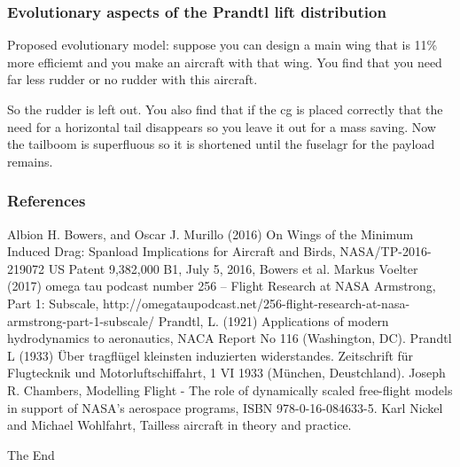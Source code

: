 \documentclass{beamer}
\begin{document}
\begin{frame}
\frametitle{Evolutionary aspects of the Prandtl lift distribution}

Proposed evolutionary model: suppose you can design a main wing that is 11\% more efficiemt and you make an aircraft with that wing. You find that you need far less rudder or no rudder with this aircraft.

So the rudder is left out. You also find that if the cg is placed correctly that the need for a horizontal tail disappears so you leave it out for a mass saving. Now the tailboom is superfluous so it is shortened until the fuselagr for the payload remains.

\end{frame}



\begin{frame}
\frametitle{References}
\footnotesize{
\begin{thebibliography}{99} %

 Albion H. Bowers, and Oscar J. Murillo (2016) On Wings of the Minimum Induced Drag:  Spanload Implications for Aircraft and Birds, NASA/TP-2016-219072
 US Patent 9,382,000 B1, July 5, 2016, Bowers et al.
 Markus Voelter (2017) omega tau podcast number 256 – Flight Research at NASA Armstrong, Part 1: Subscale, http://omegataupodcast.net/256-flight-research-at-nasa-armstrong-part-1-subscale/
 Prandtl, L.  (1921)  Applications  of  modern hydrodynamics  to  aeronautics,  NACA  Report  No  116 (Washington, DC).
 Prandtl L (1933) Über tragfl\"ugel kleinsten induzierten widerstandes. Zeitschrift für Flugtecknik und Motorluftschiffahrt, 1 VI 1933 (M\"unchen, Deustchland).
 Joseph R. Chambers, Modelling Flight - The role of dynamically scaled free-flight models in support of NASA's aerospace programs, ISBN 978-0-16-084633-5.
 Karl Nickel and Michael Wohlfahrt, Tailless aircraft in theory and practice.


\end{thebibliography}
}
\end{frame}


\begin{frame}
\Huge{\centerline{The End}}
\end{frame}

\end{document}
